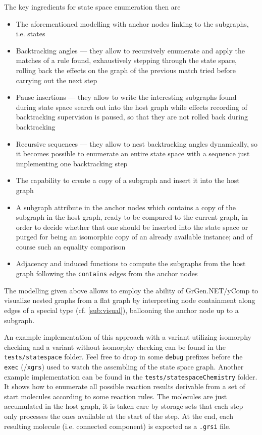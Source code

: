 The key ingredients for state space enumeration then are
\begin{itemize}
	\item The aforementioned modelling with anchor nodes linking to the subgraphs, i.e. states
	\item Backtracking angles --- they allow to recursively enumerate and apply the matches of a rule found, exhaustively stepping through the state space, rolling back the effects on the graph of the previous match tried before carrying out the next step
	\item Pause insertions --- they allow to write the interesting subgraphs found during state space search out into the host graph while effects recording of backtracking supervision is paused, so that they are not rolled back during backtracking
	\item Recursive sequences --- they allow to nest backtracking angles dynamically, so it becomes possible to enumerate an entire state space with a sequence just implementing one backtracking step
	\item The capability to create a copy of a subgraph and insert it into the host graph
	\item A subgraph attribute in the anchor nodes which contains a copy of the subgraph in the host graph, ready to be compared to the current graph, in order to decide whether that one should be inserted into the state space or purged for being an isomorphic copy of an already available instance; and of course such an equality comparison
	\item Adjacency and induced functions to compute the subgraphs from the host graph following the \texttt{contains} edges from the anchor nodes
\end{itemize}

The modelling given above allows to employ the ability of GrGen.NET/yComp to visualize nested graphs from a flat graph by interpreting node containment along edges of a special type (cf. \ref{sub:visual}), ballooning the anchor node up to a subgraph. 

An example implementation of this approach with a variant utilizing isomorphy checking and a variant without isomorphy checking can be found in the \texttt{tests/statespace} folder.
Feel free to drop in some \texttt{debug} prefixes before the \texttt{exec} (/\texttt{xgrs}) used to watch the assembling of the state space graph.
Another example implementation can be found in the \texttt{tests/statespaceChemistry} folder.
It shows how to enumerate all possible reaction results derivable from a set of start molecules according to some reaction rules.
The molecules are just accumulated in the host graph, it is taken care by storage sets that each step only processes the ones available at the start of the step.
At the end, each resulting molecule (i.e. connected component) is exported as a \texttt{.grsi} file.

